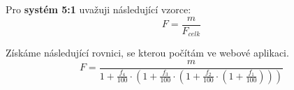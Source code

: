 \noindent Pro \textbf{systém 5:1} uvažuji následující vzorce:
\begin{equation}
    \label{eqn:9_calculation_5_1}
    F = \frac{m}{F_{celk}}
\end{equation}

\noindent Získáme následující rovnici, se kterou počítám ve webové aplikaci.
\begin{equation}
    \label{eqn:10_calculation_5_1}
    F = \frac{m}{1 + \frac{f_4}{100} \cdot (1 + \frac{f_3}{100} \cdot (1 + \frac{f_2}{100} \cdot (1 + \frac{f_1}{100})))}
\end{equation}
